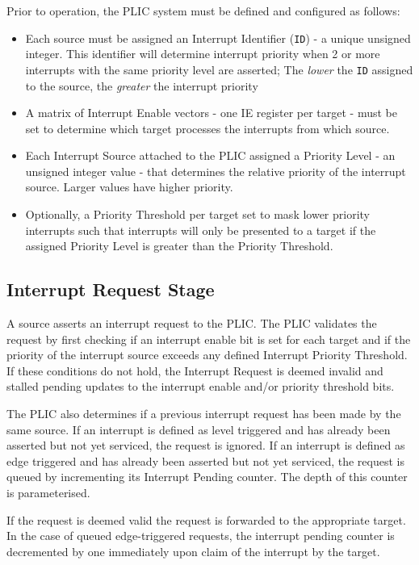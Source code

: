 Prior to operation, the PLIC system must be defined and configured as follows:

\begin{itemize}
	\item
		Each source must be assigned an Interrupt Identifier (\texttt{ID}) - a unique unsigned integer. This identifier will determine interrupt priority when 2 or more interrupts with the same priority level are asserted; The \emph{lower} the \texttt{ID} assigned to the source, the \emph{greater} the interrupt priority
	\item
		A matrix of Interrupt Enable vectors - one IE register per target - must be set to determine which target processes the interrupts from which source.
	\item
		Each Interrupt Source attached to the PLIC assigned a Priority Level - an unsigned integer value - that determines the relative priority of the interrupt source. Larger values have higher priority.
	\item
		Optionally, a Priority Threshold per target set to mask lower priority interrupts such that interrupts will only be presented to a target if the assigned Priority Level is greater than the Priority Threshold.
\end{itemize}

\subsection{Interrupt Request Stage}

A source asserts an interrupt request to the PLIC. The PLIC validates
the request by first checking if an interrupt enable bit is set for each
target and if the priority of the interrupt source exceeds any defined
Interrupt Priority Threshold. If these conditions do not hold, the
Interrupt Request is deemed invalid and stalled pending updates to the interrupt enable and/or priority threshold bits. 


The PLIC also determines if a previous interrupt request has been made by the same source.
If an interrupt is defined as level triggered and has already been asserted but not yet serviced, the request is ignored.
If an interrupt is defined as edge triggered and has already been asserted but not yet serviced, the request is queued by incrementing its Interrupt Pending counter.
The depth of this counter is parameterised.

If the request is deemed valid the request is forwarded to the
appropriate target. In the case of queued edge-triggered requests, the
interrupt pending counter is decremented by one immediately upon claim of the interrupt by the target.

